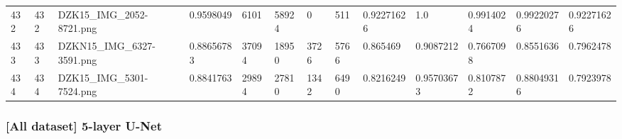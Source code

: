 \documentclass[11pt, a4paper, twoside]{report}
\begin{document}
\begin{longtable}[c]{@{}lllllllllllll@{}}
432 & 432 & DZK15\_IMG\_2052-8721.png & 0.9598049 & 6101 & 58924 & 0 & 511 & 0.92271626 & 1.0 & 0.9914024 & 0.99220276 & 0.92271626 \\
433 & 433 & DZKN15\_IMG\_6327-3591.png & 0.88656783 & 37094 & 18950 & 3726 & 5766 & 0.865469 & 0.9087212 & 0.7667098 & 0.8551636 & 0.7962478 \\
434 & 434 & DZK15\_IMG\_5301-7524.png & 0.8841763 & 29894 & 27810 & 1342 & 6490 & 0.8216249 & 0.95703673 & 0.8107872 & 0.88049316 & 0.7923978 \\* \bottomrule
\end{longtable}

\newpage

\subsubsection{[All dataset] 5-layer U-Net}
\end{document}
